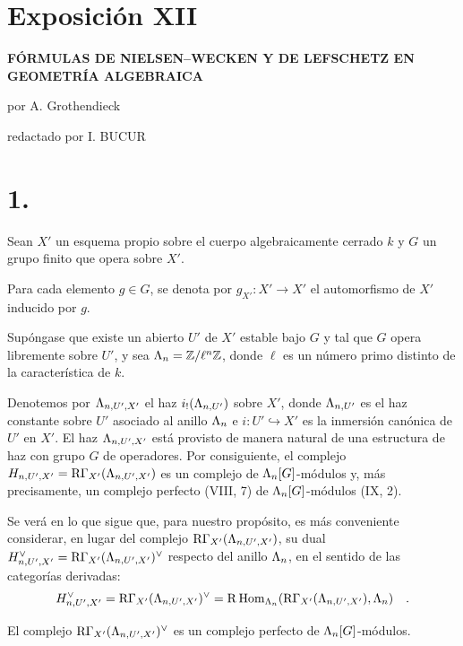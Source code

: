 \section*{Exposición XII}

\begin{center}
\Large\bf FÓRMULAS DE NIELSEN--WECKEN Y DE LEFSCHETZ EN GEOMETRÍA ALGEBRAICA
\end{center}

\begin{center}
por A. Grothendieck

redactado por I. BUCUR
\end{center}

\bigskip

\section*{1.}
Sean $X'$ un esquema propio sobre el cuerpo algebraicamente cerrado $k$ y $G$ un grupo finito que opera sobre $X'$.

Para cada elemento $g \in G$, se denota por $g_{X'} : X' \to X'$ el automorfismo de $X'$ inducido por $g$.

Supóngase que existe un abierto $U'$ de $X'$ estable bajo $G$ y tal que $G$ opera libremente sobre $U'$, y sea $\Lambda_n = \mathbb Z/\ell^n\mathbb Z$, donde $\ell$ es un número primo distinto de la característica de $k$.

Denotemos por $\Lambda_{n,U',X'}$ el haz $i_!(\Lambda_{n,U'})$ sobre $X'$, donde $\Lambda_{n,U'}$ es el haz constante sobre $U'$ asociado al anillo $\Lambda_n$ e $i : U' \hookrightarrow X'$ es la inmersión canónica de $U'$ en $X'$. El haz $\Lambda_{n,U',X'}$ está provisto de manera natural de una estructura de haz con grupo $G$ de operadores. Por consiguiente, el complejo $H_{n,U',X'} = \mathrm{R}\Gamma_{X'}(\Lambda_{n,U',X'})$ es un complejo de $\Lambda_n[G]$-módulos y, más precisamente, un complejo perfecto (VIII, 7) de $\Lambda_n[G]$-módulos (IX, 2).

Se verá en lo que sigue que, para nuestro propósito, es más conveniente considerar, en lugar del complejo $\mathrm{R}\Gamma_{X'}(\Lambda_{n,U',X'})$, su dual $H_{n,U',X'}^\vee = \mathrm{R}\Gamma_{X'}(\Lambda_{n,U',X'})^\vee$ respecto del anillo $\Lambda_n$, en el sentido de las categorías derivadas:
\[
H_{n,U',X'}^\vee = \mathrm{R}\Gamma_{X'}(\Lambda_{n,U',X'})^\vee = \mathrm{R}\operatorname{Hom}_{\Lambda_n}(\mathrm{R}\Gamma_{X'}(\Lambda_{n,U',X'}), \Lambda_n) \quad .
\]

El complejo $\mathrm{R}\Gamma_{X'}(\Lambda_{n,U',X'})^\vee$ es un complejo perfecto de $\Lambda_n[G]$-módulos.
